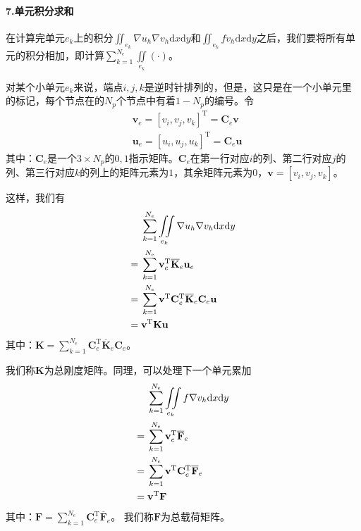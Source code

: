             \paragraph{7.单元积分求和}
            在计算完单元$e_k$上的积分$\iint_{e_k} \nabla u_h \nabla v_h \mathrm{d}x\mathrm{d}y$和$\iint_{e_k} f v_h \mathrm{d}x\mathrm{d}y$之后，我们要将所有单元的积分相加，即计算$\sum\limits_{k= 1}^{N_e }\iint\limits_{e_k}(\cdot)$。
            \par
            对某个小单元$e_k$来说，端点$i,j,k$是逆时针排列的，但是，这只是在一个小单元里的标记，每个节点在的$N_p$个节点中有着$1 - N_p$的编号。令
            \begin{align*}
                &\mathbf{v}_e = [v_i,v_j,v_k]^\mathrm{T} = \mathbf{C}_e\mathbf{v}\\
                &\mathbf{u}_e = [u_i,u_j,u_k]^\mathrm{T} = \mathbf{C}_e\mathbf{u}
            \end{align*}
            其中：$\mathbf{C}_e$是一个$3\times N_p$的$0,1$指示矩阵。$\mathbf{C}_e$在第一行对应$i$的列、第二行对应$j$的列、第三行对应$k$的列上的矩阵元素为$1$，其余矩阵元素为$0$，$\mathbf{v} = [v_i,v_j,v_k]$。
            \par
            这样，我们有
            \begin{align}
                \label{单元积分求和1}
                   &\sum\limits_{k= 1}^{N_e }\iint\limits_{e_k}\nabla u_h \nabla v_h \mathrm{d}x\mathrm{d}y \notag \\
                ={}&\sum\limits_{k= 1}^{N_e }\mathbf{v}_e^\mathrm{T} \overline{\mathbf{K}}_e\mathbf{u}_e\notag \\
                ={}&\sum\limits_{k= 1}^{N_e }\mathbf{v}^\mathrm{T} \mathbf{C}_e^\mathrm{T}\overline{\mathbf{K}}_e \mathbf{C}_e \mathbf{u}\notag \\
                ={}&\mathbf{v}^\mathrm{T} \mathbf{K}\mathbf{u}
            \end{align}
            其中：$\mathbf{K} = \sum\limits_{k= 1}^{N_e }\mathbf{C}_e^\mathrm{T}\overline{\mathbf{K}}_e \mathbf{C}_e$。
            \par
            我们称$\mathbf{K}$为总刚度矩阵。同理，可以处理下一个单元累加
            \begin{align}
                \label{单元积分求和2}
                   &\sum\limits_{k= 1}^{N_e }\iint\limits_{e_k}f \nabla v_h \mathrm{d}x\mathrm{d}y \notag \\
                ={}&\sum\limits_{k= 1}^{N_e }\mathbf{v}_e^\mathrm{T} \overline{\mathbf{F}}_e \notag \\
                ={}&\sum\limits_{k= 1}^{N_e }\mathbf{v}^\mathrm{T} \mathbf{C}_e^\mathrm{T}\overline{\mathbf{F}}_e \notag \\
                ={}&\mathbf{v}^\mathrm{T} \mathbf{F}
            \end{align}
            其中：$\mathbf{F} = \sum\limits_{k= 1}^{N_e }\mathbf{C}_e^\mathrm{T}\overline{\mathbf{F}}_e $。
            我们称$\mathbf{F}$为总载荷矩阵。
